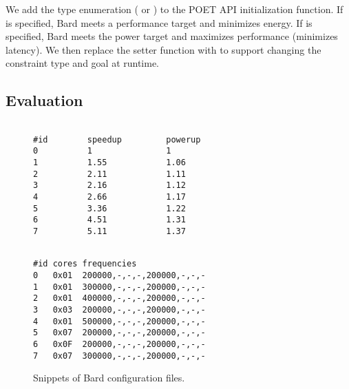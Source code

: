 We add the  type enumeration ( or ) to the POET API initialization function.
If  is specified, Bard meets a performance target and minimizes energy.
If  is specified, Bard meets the power target and maximizes performance (minimizes latency).
We then replace the setter function  with  to support changing the constraint type and goal at runtime.


\subsection{Evaluation}


\begin{figure}[t]
\centering
\begin{minipage}[t]{.45\columnwidth}
\lstset{
  belowskip=0pt,
  aboveskip=0pt,
  numbers=none,
}
\begin{lstlisting}[frame=tlr,%
  caption={System-agnostic.},%
  label={lst:control_config_example}]%

#id        speedup         powerup
0          1               1
1          1.55            1.06
2          2.11            1.11
3          2.16            1.12
4          2.66            1.17
5          3.36            1.22
6          4.51            1.31
7          5.11            1.37
\end{lstlisting}
\end{minipage}\hfill
\begin{minipage}[t]{.45\columnwidth}
\lstset{
  belowskip=0pt,
  aboveskip=0pt,
  numbers=none,
}
\begin{lstlisting}[frame=tlr,%
  caption={System-specific.},%
  label={lst:cpu_config_example}]%

#id cores frequencies
0   0x01  200000,-,-,-,200000,-,-,-
1   0x01  300000,-,-,-,200000,-,-,-
2   0x01  400000,-,-,-,200000,-,-,-
3   0x03  200000,-,-,-,200000,-,-,-
4   0x01  500000,-,-,-,200000,-,-,-
5   0x07  200000,-,-,-,200000,-,-,-
6   0x0F  200000,-,-,-,200000,-,-,-
7   0x07  300000,-,-,-,200000,-,-,-
\end{lstlisting}
\end{minipage}
\caption{Snippets of Bard configuration files.}
\label{fig:bard-config-examples}
\end{figure}


